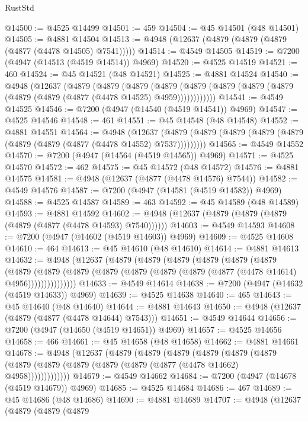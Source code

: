 \begin{lexlean}{RustStd}
\begin{coremodule}
@14500 := @4525 @14499
@14501 := 459
@14504 := @45 @14501 (@48 @14501)
@14505 := @4881 @14504
@14513 := @4948 (@12637 (@4879 (@4879 (@4879 (@4877 (@4478 @14505) @7541)))))
@14514 := @4549 @14505
@14519 := @7200 (@4947 (@14513 (@4519 @14514)) @4969)
@14520 := @4525 @14519
@14521 := 460
@14524 := @45 @14521 (@48 @14521)
@14525 := @4881 @14524
@14540 := @4948
    (@12637
      (@4879
        (@4879
          (@4879
            (@4879 (@4879 (@4879 (@4879 (@4879 (@4879 (@4879 (@4877 (@4478 @14525) @4959))))))))))))
@14541 := @4549 @14525
@14546 := @7200 (@4947 (@14540 (@4519 @14541)) @4969)
@14547 := @4525 @14546
@14548 := 461
@14551 := @45 @14548 (@48 @14548)
@14552 := @4881 @14551
@14564 := @4948
    (@12637 (@4879 (@4879 (@4879 (@4879 (@4879 (@4879 (@4879 (@4877 (@4478 @14552) @7537)))))))))
@14565 := @4549 @14552
@14570 := @7200 (@4947 (@14564 (@4519 @14565)) @4969)
@14571 := @4525 @14570
@14572 := 462
@14575 := @45 @14572 (@48 @14572)
@14576 := @4881 @14575
@14581 := @4948 (@12637 (@4877 (@4478 @14576) @7544))
@14582 := @4549 @14576
@14587 := @7200 (@4947 (@14581 (@4519 @14582)) @4969)
@14588 := @4525 @14587
@14589 := 463
@14592 := @45 @14589 (@48 @14589)
@14593 := @4881 @14592
@14602 := @4948 (@12637 (@4879 (@4879 (@4879 (@4879 (@4877 (@4478 @14593) @7540))))))
@14603 := @4549 @14593
@14608 := @7200 (@4947 (@14602 (@4519 @14603)) @4969)
@14609 := @4525 @14608
@14610 := 464
@14613 := @45 @14610 (@48 @14610)
@14614 := @4881 @14613
@14632 := @4948
    (@12637
      (@4879
        (@4879
          (@4879
            (@4879
              (@4879
                (@4879
                  (@4879
                    (@4879
                      (@4879 (@4879 (@4879 (@4879 (@4879 (@4877 (@4478 @14614) @4956)))))))))))))))
@14633 := @4549 @14614
@14638 := @7200 (@4947 (@14632 (@4519 @14633)) @4969)
@14639 := @4525 @14638
@14640 := 465
@14643 := @45 @14640 (@48 @14640)
@14644 := @4881 @14643
@14650 := @4948 (@12637 (@4879 (@4877 (@4478 @14644) @7543)))
@14651 := @4549 @14644
@14656 := @7200 (@4947 (@14650 (@4519 @14651)) @4969)
@14657 := @4525 @14656
@14658 := 466
@14661 := @45 @14658 (@48 @14658)
@14662 := @4881 @14661
@14678 := @4948
    (@12637
      (@4879
        (@4879
          (@4879
            (@4879
              (@4879
                (@4879 (@4879 (@4879 (@4879 (@4879 (@4879 (@4877 (@4478 @14662) @4958)))))))))))))
@14679 := @4549 @14662
@14684 := @7200 (@4947 (@14678 (@4519 @14679)) @4969)
@14685 := @4525 @14684
@14686 := 467
@14689 := @45 @14686 (@48 @14686)
@14690 := @4881 @14689
@14707 := @4948
    (@12637
      (@4879
        (@4879
          (@4879

\end{coremodule}
\end{lexlean}
